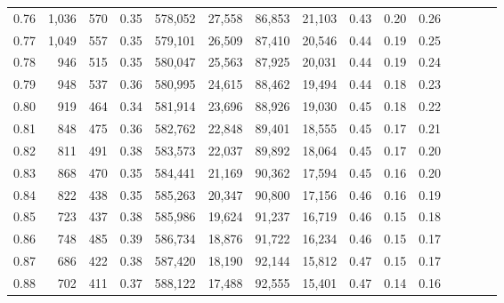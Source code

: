 \begin{tabular}{rrrcrrrrrrrrrrr}
0.76 &   1,036 &     570 &                                       0.35 &  578,052 &   27,558 &   86,853 &   21,103 &  0.43 &  0.20 &                         0.26 \\
0.77 &   1,049 &     557 &                                       0.35 &  579,101 &   26,509 &   87,410 &   20,546 &  0.44 &  0.19 &                         0.25 \\
0.78 &     946 &     515 &                                       0.35 &  580,047 &   25,563 &   87,925 &   20,031 &  0.44 &  0.19 &                         0.24 \\
0.79 &     948 &     537 &                                       0.36 &  580,995 &   24,615 &   88,462 &   19,494 &  0.44 &  0.18 &                         0.23 \\
0.80 &     919 &     464 &                                       0.34 &  581,914 &   23,696 &   88,926 &   19,030 &  0.45 &  0.18 &                         0.22 \\
0.81 &     848 &     475 &                                       0.36 &  582,762 &   22,848 &   89,401 &   18,555 &  0.45 &  0.17 &                         0.21 \\
0.82 &     811 &     491 &                                       0.38 &  583,573 &   22,037 &   89,892 &   18,064 &  0.45 &  0.17 &                         0.20 \\
0.83 &     868 &     470 &                                       0.35 &  584,441 &   21,169 &   90,362 &   17,594 &  0.45 &  0.16 &                         0.20 \\
0.84 &     822 &     438 &                                       0.35 &  585,263 &   20,347 &   90,800 &   17,156 &  0.46 &  0.16 &                         0.19 \\
0.85 &     723 &     437 &                                       0.38 &  585,986 &   19,624 &   91,237 &   16,719 &  0.46 &  0.15 &                         0.18 \\
0.86 &     748 &     485 &                                       0.39 &  586,734 &   18,876 &   91,722 &   16,234 &  0.46 &  0.15 &                         0.17 \\
0.87 &     686 &     422 &                                       0.38 &  587,420 &   18,190 &   92,144 &   15,812 &  0.47 &  0.15 &                         0.17 \\
0.88 &     702 &     411 &                                       0.37 &  588,122 &   17,488 &   92,555 &   15,401 &  0.47 &  0.14 &                         0.16 \\

\end{tabular}
